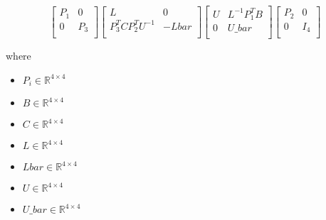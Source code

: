 \documentclass[12pt]{article}
\begin{document}
\[
\begin{bmatrix}
\textit{P}_{ 1 } & 0\\
0 & \textit{P}_{ 3 }\\
\end{bmatrix}\begin{bmatrix}
\textit{L} & 0\\
\textit{P}_{ 3 }^T\textit{C}\textit{P}_{ 2 }^T\textit{U}^{-1} & -\textit{Lbar}\\
\end{bmatrix}\begin{bmatrix}
\textit{U} & \textit{L}^{-1}\textit{P}_{ 1 }^T\textit{B}\\
0 & \textit{U\_bar}\\
\end{bmatrix}\begin{bmatrix}
\textit{P}_{ 2 } & 0\\
0 & I_{ 4 }\\
\end{bmatrix}
\]

where
\begin{itemize}
\item $\textit{P}_{\textit{i}} \in \mathbb{R}^{ 4 \times 4 }$
\item $\textit{B} \in \mathbb{R}^{ 4 \times 4 }$
\item $\textit{C} \in \mathbb{R}^{ 4 \times 4 }$
\item $\textit{L} \in \mathbb{R}^{ 4 \times 4 }$
\item $\textit{Lbar} \in \mathbb{R}^{ 4 \times 4 }$
\item $\textit{U} \in \mathbb{R}^{ 4 \times 4 }$
\item $\textit{U\_bar} \in \mathbb{R}^{ 4 \times 4 }$
\end{itemize}
\end{document}
